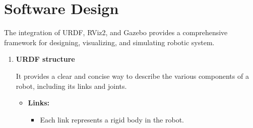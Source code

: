 \section{\fontsize{14}{16} Software Design}
{
	\fontsize{12}{14}
	The integration of URDF, RViz2, and Gazebo provides a comprehensive framework for
	designing, visualizing, and simulating robotic system.
	
	\begin{enumerate}[label=\textbf{\arabic*}.]
		\item \textbf{URDF structure} \par It provides a clear and concise way to describe the various components of a robot, including its
		links and joints.
				
		\begin{itemize}
			\item \textbf{Links:}
			\begin{itemize}
				\item Each link represents a rigid body in the robot.
		

\end{itemize}
\end{itemize}
\end{enumerate}}
